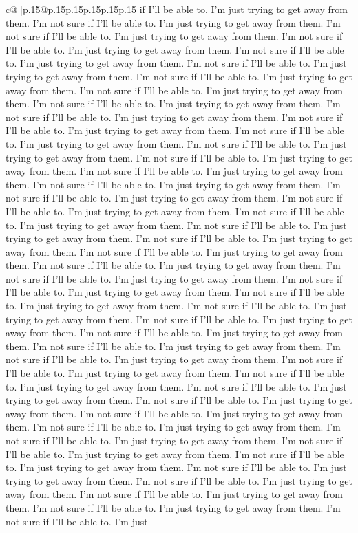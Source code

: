 \documentclass{article}
\begin{document}
{\begin{supertabular}{c@{$\;$}|p{.15\linewidth}@{}p{.15\linewidth}p{.15\linewidth}p{.15\linewidth}p{.15\linewidth}p{.15\linewidth}}
{{{if I'll be able to. I'm just trying to get away from them. I'm not sure if I'll be able to. I'm just trying to get away from them. I'm not sure if I'll be able to. I'm just trying to get away from them. I'm not sure if I'll be able to. I'm just trying to get away from them. I'm not sure if I'll be able to. I'm just trying to get away from them. I'm not sure if I'll be able to. I'm just trying to get away from them. I'm not sure if I'll be able to. I'm just trying to get away from them. I'm not sure if I'll be able to. I'm just trying to get away from them. I'm not sure if I'll be able to. I'm just trying to get away from them. I'm not sure if I'll be able to. I'm just trying to get away from them. I'm not sure if I'll be able to. I'm just trying to get away from them. I'm not sure if I'll be able to. I'm just trying to get away from them. I'm not sure if I'll be able to. I'm just trying to get away from them. I'm not sure if I'll be able to. I'm just trying to get away from them. I'm not sure if I'll be able to. I'm just trying to get away from them. I'm not sure if I'll be able to. I'm just trying to get away from them. I'm not sure if I'll be able to. I'm just trying to get away from them. I'm not sure if I'll be able to. I'm just trying to get away from them. I'm not sure if I'll be able to. I'm just trying to get away from them. I'm not sure if I'll be able to. I'm just trying to get away from them. I'm not sure if I'll be able to. I'm just trying to get away from them. I'm not sure if I'll be able to. I'm just trying to get away from them. I'm not sure if I'll be able to. I'm just trying to get away from them. I'm not sure if I'll be able to. I'm just trying to get away from them. I'm not sure if I'll be able to. I'm just trying to get away from them. I'm not sure if I'll be able to. I'm just trying to get away from them. I'm not sure if I'll be able to. I'm just trying to get away from them. I'm not sure if I'll be able to. I'm just trying to get away from them. I'm not sure if I'll be able to. I'm just trying to get away from them. I'm not sure if I'll be able to. I'm just trying to get away from them. I'm not sure if I'll be able to. I'm just trying to get away from them. I'm not sure if I'll be able to. I'm just trying to get away from them. I'm not sure if I'll be able to. I'm just trying to get away from them. I'm not sure if I'll be able to. I'm just trying to get away from them. I'm not sure if I'll be able to. I'm just trying to get away from them. I'm not sure if I'll be able to. I'm just trying to get away from them. I'm not sure if I'll be able to. I'm just trying to get away from them. I'm not sure if I'll be able to. I'm just trying to get away from them. I'm not sure if I'll be able to. I'm just trying to get away from them. I'm not sure if I'll be able to. I'm just trying to get away from them. I'm not sure if I'll be able to. I'm just trying to get away from them. I'm not sure if I'll be able to. I'm just trying to get away from them. I'm not sure if I'll be able to. I'm just trying to get away from them. I'm not sure if I'll be able to. I'm just trying to get away from them. I'm not sure if I'll be able to. I'm just }}}
\end{supertabular}}
\end{document}
